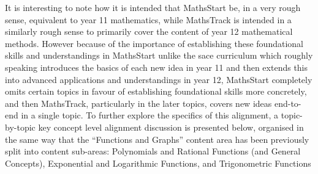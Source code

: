 \documentclass[twoside,12pt,a4paper]{report}
\begin{document}
It is interesting to note how it is intended that MathsStart be, in a very rough sense, equivalent to year 11 mathematics, while MathsTrack is intended in a similarly rough sense to primarily cover the content of year 12 mathematical methods. However because of the importance of establishing these foundational skills and understandings in MathsStart unlike the \gls{sace} curriculum which roughly speaking introduces the basics of each new idea in year 11 and then extends this into advanced applications and understandings in year 12, MathsStart completely omits certain topics in favour of establishing foundational skills more concretely, and then MathsTrack, particularly in the later topics, covers new ideas end-to-end in a single topic. To further explore the specifics of this alignment, a topic-by-topic key concept level alignment discussion is presented below, organised in the same way that the ``Functions and Graphs'' content area has been previously split into content sub-areas: Polynomials and Rational Functions (and General Concepts), Exponential and Logarithmic Functions, and Trigonometric Functions
\end{document}
